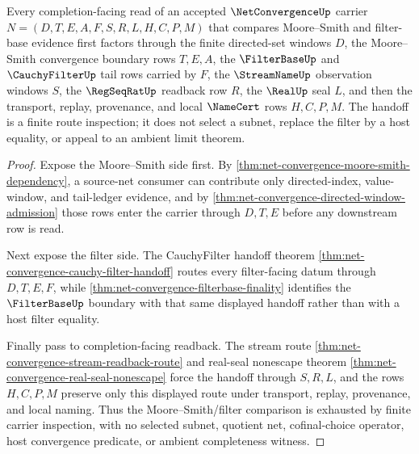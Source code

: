 \begin{theorem}
\label{thm:net-convergence-moore-smith-filter-handoff}
Every completion-facing read of an accepted $\NetConvergenceUp$ carrier $N=(D,T,E,A,F,S,R,L,H,C,P,M)$ that compares Moore--Smith and filter-base evidence first factors through the finite directed-set windows $D$, the Moore--Smith convergence boundary rows $T,E,A$, the $\FilterBaseUp$ and $\CauchyFilterUp$ tail rows carried by $F$, the $\StreamNameUp$ observation windows $S$, the $\RegSeqRatUp$ readback row $R$, the $\RealUp$ seal $L$, and then the transport, replay, provenance, and local $\NameCert$ rows $H,C,P,M$. The handoff is a finite route inspection; it does not select a subnet, replace the filter by a host equality, or appeal to an ambient limit theorem.
\end{theorem}
\begin{proof}
Expose the Moore--Smith side first. By \autoref{thm:net-convergence-moore-smith-dependency}, a source-net consumer can contribute only directed-index, value-window, and tail-ledger evidence, and by \autoref{thm:net-convergence-directed-window-admission} those rows enter the carrier through $D,T,E$ before any downstream row is read.

Next expose the filter side. The CauchyFilter handoff theorem \autoref{thm:net-convergence-cauchy-filter-handoff} routes every filter-facing datum through $D,T,E,F$, while \autoref{thm:net-convergence-filterbase-finality} identifies the $\FilterBaseUp$ boundary with that same displayed handoff rather than with a host filter equality.

Finally pass to completion-facing readback. The stream route \autoref{thm:net-convergence-stream-readback-route} and real-seal nonescape theorem \autoref{thm:net-convergence-real-seal-nonescape} force the handoff through $S,R,L$, and the rows $H,C,P,M$ preserve only this displayed route under transport, replay, provenance, and local naming. Thus the Moore--Smith/filter comparison is exhausted by finite carrier inspection, with no selected subnet, quotient net, cofinal-choice operator, host convergence predicate, or ambient completeness witness.
\end{proof}

